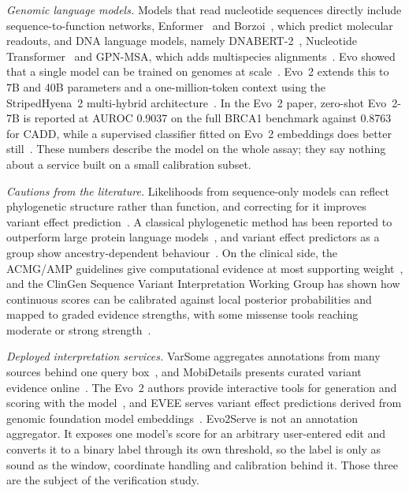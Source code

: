 \documentclass[10pt,journal,a4paper]{IEEEtran}
\begin{document}
\textit{Genomic language models.} Models that read nucleotide sequences directly include sequence-to-function networks, Enformer~\cite{avsec2021enformer} and Borzoi~\cite{linder2025borzoi}, which predict molecular readouts, and DNA language models, namely DNABERT-2~\cite{zhou2024dnabert2}, Nucleotide Transformer~\cite{dallatorre2024nt} and GPN-MSA, which adds multispecies alignments~\cite{benegas2025gpnmsa}. Evo showed that a single model can be trained on genomes at scale~\cite{nguyen2024evo}. Evo~2 extends this to 7B and 40B parameters and a one-million-token context using the StripedHyena~2 multi-hybrid architecture~\cite{brixi2025stripedhyena2,brixi2026evo2}. In the Evo~2 paper, zero-shot Evo~2-7B is reported at AUROC 0.9037 on the full BRCA1 benchmark against 0.8763 for CADD, while a supervised classifier fitted on Evo~2 embeddings does better still~\cite{brixi2026evo2}. These numbers describe the model on the whole assay; they say nothing about a service built on a small calibration subset.

\textit{Cautions from the literature.} Likelihoods from sequence-only models can reflect phylogenetic structure rather than function, and correcting for it improves variant effect prediction~\cite{pugh2025likelihood}. A classical phylogenetic method has been reported to outperform large protein language models~\cite{prillo2024siterm}, and variant effect predictors as a group show ancestry-dependent behaviour~\cite{pathak2024ancestry}. On the clinical side, the ACMG/AMP guidelines give computational evidence at most supporting weight~\cite{richards2015acmg}, and the ClinGen Sequence Variant Interpretation Working Group has shown how continuous scores can be calibrated against local posterior probabilities and mapped to graded evidence strengths, with some missense tools reaching moderate or strong strength~\cite{pejaver2022svi}.

\textit{Deployed interpretation services.} VarSome aggregates annotations from many sources behind one query box~\cite{kopanos2019varsome}, and MobiDetails presents curated variant evidence online~\cite{baux2021mobidetails}. The Evo~2 authors provide interactive tools for generation and scoring with the model~\cite{brixi2026evo2}, and EVEE serves variant effect predictions derived from genomic foundation model embeddings~\cite{pearce2026evee}. Evo2Serve is not an annotation aggregator. It exposes one model's score for an arbitrary user-entered edit and converts it to a binary label through its own threshold, so the label is only as sound as the window, coordinate handling and calibration behind it. Those three are the subject of the verification study.
\end{document}
